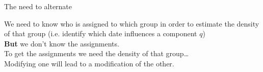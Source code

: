 \begin{frame}{\subsecname}

\begin{block}{The need to alternate}

We need to know who is assigned to which group in order to estimate the density of that group (i.e. identify which date influences a component $q$)\\
\textbf{But} we don't know the assignments.\\
To get the assignments we need the density of that group\ldots\\

Modifying one will lead to a modification of the other.

\end{block}

\pause


\end{frame}
